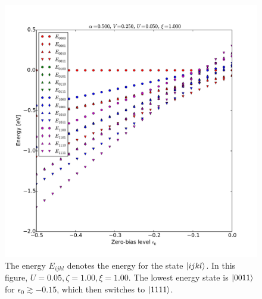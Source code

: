 \begin{figure}[!bt]
    \centering
    \includegraphics[height=.45\textheight]{pdf/energy/pespin_distribution_u1_k2.pdf}
    \caption{The energy $E_{ijkl}$ denotes the energy for the state $\ket{ijkl}$. In this figure, $U=0.05, \zeta=1.00, \xi=1.00$. The lowest energy state is $\ket{0011}$ for $\epsilon_0\gtrsim -0.15$, which then switches to $\ket{1111}$.}
    \label{fig:perspinenergy12}
\end{figure} 
